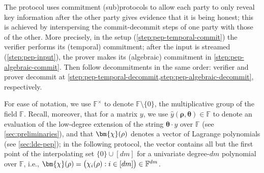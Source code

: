 \documentclass[10pt,a4paper]{article}
\theoremstyle{definition}
\newcommand{\field}{\mathbb{F}}
\newcommand{\pcommitstring}{y}
\newcommand{\dimension}{m}
\newcommand{\degree}{d}
\newcommand{\fingerprinttuple}{\bm{\rho}}
\def\rfe#1{
    \ifnum#1=1
        \rho
    \else
    \ifnum#1=2
        \sigma
    \else
    \fi\fi
}
\begin{document}
The protocol uses commitment (sub)protocols to allow each party to only reveal key information after the other party gives evidence that it is being honest; this is achieved by interspersing the commit-decommit steps of one party with those of the other. More precisely, in the setup (\cref{step:pep-temporal-commit}) the verifier performs its (temporal) commitment; after the input is streamed (\cref{step:pep-input}), the prover makes its (algebraic) commitment in \cref{step:pep-algebraic-commit}. Then follow decommitments in the same order: verifier and prover decommit at \cref{step:pep-temporal-decommit,step:pep-algebraic-decommit}, respectively.

For ease of notation, we use $\field^\times$ to denote $\field \setminus \{0\}$, the multiplicative group of the field $\field$. Recall, moreover, that for a matrix $\pcommitstring$, we use $\hat \pcommitstring(\fingerprinttuple, \bm{\theta}) \in \field$ to denote an evaluation of the low-degree extension of the string $\bm{\theta} \cdot \pcommitstring$ over $\field$ (see \cref{sec:preliminaries}), and that $\bm{\chi}(\rfe1)$ denotes a vector of Lagrange polynomials (see \cref{sec:lde-pep}); in the following protocol, the vector contains all but the first point of the interpolating set $\{0\} \cup [\degree\dimension]$ for a univariate degree-$\degree\dimension$ polynomial over $\field$, i.e., $\bm{\chi}(\rfe1) = \big(\chi_i(\rfe1) : i \in [\degree\dimension] \big) \in \field^{\degree\dimension}$.
\end{document}
